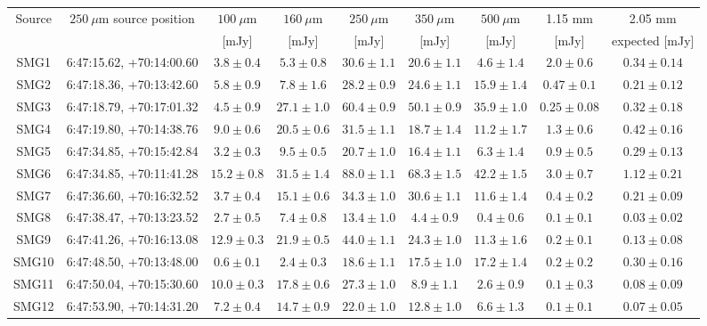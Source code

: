 \documentclass[traditabstract]{aa}
\begin{document}
\begin{table}[h]
\begin{center}
\begin{tabular}{ccccccccc}
\hline
\hline
Source & $250~\mu$m source position & $100~\mu$m & $160~\mu$m & $250~\mu$m & $350~\mu$m & $500~\mu$m & 1.15 mm & 2.05 mm \\
 &  & [mJy] & [mJy] & [mJy] & [mJy] & [mJy] & [mJy] &  expected [mJy] \\
\hline
SMG1 & 6:47:15.62, +70:14:00.60 & $3.8\pm 0.4$ & $5.3\pm 0.8$ & $30.6\pm 1.1$ & $20.6\pm 1.1$ & $4.6\pm  1.4$& $2.0\pm  0.6$ & $0.34\pm  0.14$\\
SMG2 & 6:47:18.36, +70:13:42.60 & $5.8\pm 0.9$ & $7.8\pm 1.6$ & $28.2\pm 0.9$ & $24.6\pm 1.1$ & $15.9\pm  1.4$& $0.47\pm  0.1$ & $0.21\pm  0.12$\\
SMG3 & 6:47:18.79, +70:17:01.32 & $4.5\pm 0.9$ & $27.1\pm 1.0$ & $60.4\pm 0.9$ & $50.1\pm 0.9$ & $35.9\pm  1.0$& $0.25\pm  0.08$ & $0.32\pm  0.18$\\
SMG4 & 6:47:19.80, +70:14:38.76 & $9.0\pm 0.6$ & $20.5\pm 0.6$ & $31.5\pm 1.1$ & $18.7\pm 1.4$ & $11.2\pm  1.7$& $1.3\pm  0.6$ & $0.42\pm  0.16$\\
SMG5 & 6:47:34.85, +70:15:42.84 & $3.2\pm 0.3$ & $9.5\pm 0.5$ & $20.7\pm 1.0$ & $16.4\pm 1.1$ & $6.3\pm  1.4$& $0.9\pm  0.5$ & $0.29\pm  0.13$\\
SMG6 & 6:47:34.85, +70:11:41.28 & $15.2\pm 0.8$ & $31.5\pm 1.4$ & $88.0\pm 1.1$ & $68.3\pm 1.5$ & $42.2\pm  1.5$& $3.0\pm  0.7$ & $1.12\pm  0.21$\\
SMG7 & 6:47:36.60, +70:16:32.52 & $3.7\pm 0.4$ & $15.1\pm 0.6$ & $34.3\pm 1.0$ & $30.6\pm 1.1$ & $11.6\pm  1.4$& $0.4\pm  0.2$ & $0.21\pm  0.09$\\
SMG8 & 6:47:38.47, +70:13:23.52 & $2.7\pm 0.5$ & $7.4\pm 0.8$ & $13.4\pm 1.0$ & $4.4\pm 0.9$ & $0.4\pm  0.6$& $0.1\pm  0.1$ & $0.03\pm  0.02$\\
SMG9 & 6:47:41.26, +70:16:13.08 & $12.9\pm 0.3$ & $21.9\pm 0.5$ & $44.0\pm 1.1$ & $24.3\pm 1.0$ & $11.3\pm  1.6$& $0.2\pm  0.1$ & $0.13\pm  0.08$\\
SMG10 & 6:47:48.50, +70:13:48.00 & $0.6\pm 0.1$ & $2.4\pm 0.3$ & $18.6\pm 1.1$ & $17.5\pm 1.0$ & $17.2\pm  1.4$& $0.2\pm  0.2$ & $0.30\pm  0.16$\\
SMG11 & 6:47:50.04, +70:15:30.60 & $10.0\pm 0.3$ & $17.8\pm 0.6$ & $27.3\pm 1.0$ & $8.9\pm 1.1$ & $2.6\pm  0.9$& $0.1\pm  0.3$ & $0.08\pm  0.09$\\
SMG12 & 6:47:53.90, +70:14:31.20 & $7.2\pm 0.4$ & $14.7\pm 0.9$ & $22.0\pm 1.0$ & $12.8\pm 1.0$ & $6.6\pm  1.3$& $0.1\pm  0.1$ & $0.07\pm  0.05$\\

\end{tabular}
\end{center}
\end{table}
\end{document}
